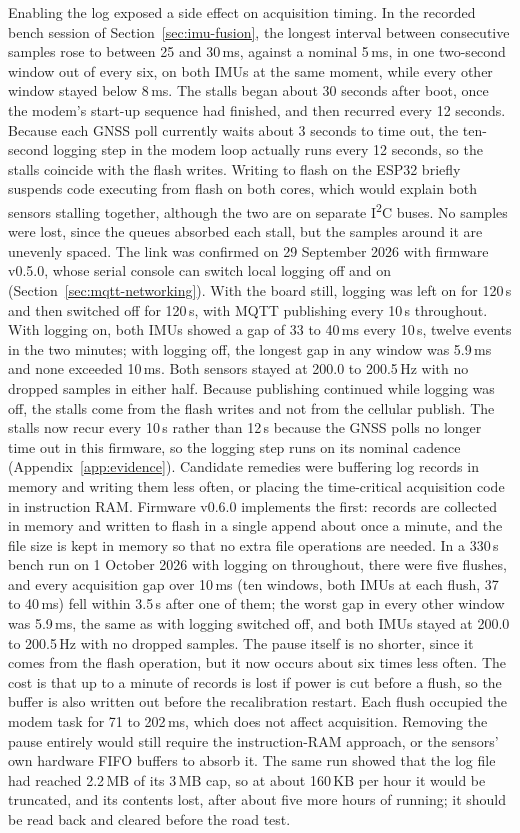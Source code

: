 Enabling the log exposed a side effect on acquisition timing. In the recorded bench session of Section~\ref{sec:imu-fusion}, the longest interval between consecutive samples rose to between 25 and 30\,ms, against a nominal 5\,ms, in one two-second window out of every six, on both IMUs at the same moment, while every other window stayed below 8\,ms. The stalls began about 30 seconds after boot, once the modem's start-up sequence had finished, and then recurred every 12 seconds. Because each GNSS poll currently waits about 3 seconds to time out, the ten-second logging step in the modem loop actually runs every 12 seconds, so the stalls coincide with the flash writes. Writing to flash on the ESP32 briefly suspends code executing from flash on both cores, which would explain both sensors stalling together, although the two are on separate I\textsuperscript{2}C buses. No samples were lost, since the queues absorbed each stall, but the samples around it are unevenly spaced. The link was confirmed on 29 September 2026 with firmware v0.5.0, whose serial console can switch local logging off and on (Section~\ref{sec:mqtt-networking}). With the board still, logging was left on for 120\,s and then switched off for 120\,s, with MQTT publishing every 10\,s throughout. With logging on, both IMUs showed a gap of 33 to 40\,ms every 10\,s, twelve events in the two minutes; with logging off, the longest gap in any window was 5.9\,ms and none exceeded 10\,ms. Both sensors stayed at 200.0 to 200.5\,Hz with no dropped samples in either half. Because publishing continued while logging was off, the stalls come from the flash writes and not from the cellular publish. The stalls now recur every 10\,s rather than 12\,s because the GNSS polls no longer time out in this firmware, so the logging step runs on its nominal cadence (Appendix~\ref{app:evidence}). Candidate remedies were buffering log records in memory and writing them less often, or placing the time-critical acquisition code in instruction RAM. Firmware v0.6.0 implements the first: records are collected in memory and written to flash in a single append about once a minute, and the file size is kept in memory so that no extra file operations are needed. In a 330\,s bench run on 1 October 2026 with logging on throughout, there were five flushes, and every acquisition gap over 10\,ms (ten windows, both IMUs at each flush, 37 to 40\,ms) fell within 3.5\,s after one of them; the worst gap in every other window was 5.9\,ms, the same as with logging switched off, and both IMUs stayed at 200.0 to 200.5\,Hz with no dropped samples. The pause itself is no shorter, since it comes from the flash operation, but it now occurs about six times less often. The cost is that up to a minute of records is lost if power is cut before a flush, so the buffer is also written out before the recalibration restart. Each flush occupied the modem task for 71 to 202\,ms, which does not affect acquisition. Removing the pause entirely would still require the instruction-RAM approach, or the sensors' own hardware FIFO buffers to absorb it. The same run showed that the log file had reached 2.2\,MB of its 3\,MB cap, so at about 160\,KB per hour it would be truncated, and its contents lost, after about five more hours of running; it should be read back and cleared before the road test.

